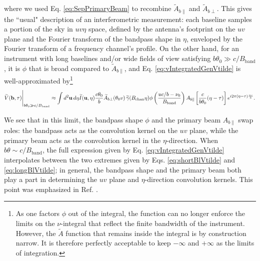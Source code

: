 \documentclass[twocolumn,aps,prd,nofootinbib,showpacs]{revtex4-1}
\begin{document}
\begin{widetext}
\begin{equation}
\end{equation}
where we used  Eq. \eqref{eq:SepPrimaryBeam} to recombine $\widetilde{A}_{b\parallel}$ and $\widetilde{A}_{b\perp}$.  This gives the ``usual" description of an interferometric measurement: each baseline samples a portion of the sky in $uv\eta$ space, defined by the antenna's footprint on the $uv$ plane and the Fourier transform of the bandpass shape in $\eta$, enveloped by the Fourier transform of a frequency channel's profile.  On the other hand, for an instrument with long baselines and/or wide fields of view satisfying $b\theta_0 \gg c/B_\textrm{band} $, it is $\phi$ that is broad compared to $\widetilde{A}_{b\parallel}$, and  Eq. \eqref{eq:vIntegratedGenVtilde} is well-approximated by\footnote{As one factors $\phi$ out of the integral, the function can no longer enforce the limits on the $\nu$-integral that reflect the finite bandwidth of the instrument.  However, the $\widetilde{A}$ function that remains inside the integral is by construction narrow.  It is therefore perfectly acceptable to keep $-\infty$ and $+\infty$ as the limits of integration.}
\begin{equation}
\label{eq:longBlVtilde}
\widetilde{V} (\mathbf{b}, \tau) \Bigg{|}_{b\theta_0 \gg c/B_\textrm{band}} \approx \int d^2\mathbf{u} \, d\eta \widetilde{I} (\mathbf{u}, \eta) \frac{c \theta_0}{b} \widetilde{A}_{b\perp} (\theta_0 v) \,\widetilde{\gamma}(B_\textrm{chan} \eta)  \phi \left( \frac{uc/b - \nu_0}{B_\textrm{band}} \right) A_{b\parallel} \left[ \frac{c}{b \theta_0} ( \eta - \tau ) \right] e^{i 2\pi (\eta - \tau) \frac{uc}{b} }.
\end{equation}
\end{widetext}
We see that in this limit, the bandpass shape $\phi$ and the primary beam $A_{b\parallel}$ swap roles: the bandpass acts as the convolution kernel on the $uv$ plane, while the primary beam acts as the convolution kernel in the $\eta$-direction.  When $b\theta \sim c / B_\textrm{band}$, the full expression given by  Eq. \eqref{eq:vIntegratedGenVtilde} interpolates between the two extremes given by  Eqs. \eqref{eq:shortBlVtilde} and \eqref{eq:longBlVtilde}; in general, the bandpass shape and the primary beam both play a part in determining the $uv$ plane and $\eta$-direction convolution kernels.  This point was emphasized in Ref. \cite{Parsons2012b}.
\end{document}
